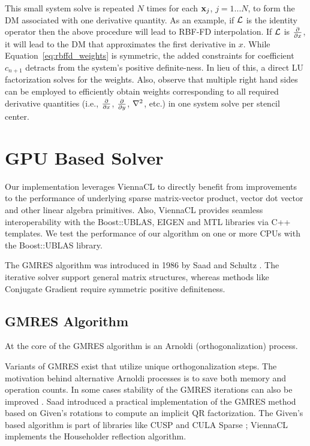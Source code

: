 This small system solve is repeated $N$ times for each $\mathbf{x}_j$, $j=1...N$, to form the DM associated with one derivative quantity.
As an example, if $\diffop$ is the identity operator then the above procedure will lead to RBF-FD interpolation. If $\diffop$ is $\frac{\partial }{\partial x}$, it will lead to the DM that approximates the first derivative in $x$. %
While Equation~\ref{eq:rbffd_weights} is symmetric, the added constraints for coefficient $c_{n+1}$ detracts from the system's positive definite-ness. In lieu of this, a direct LU factorization solves for the weights. 
Also, observe that multiple right hand sides can be employed to efficiently obtain weights corresponding to all required derivative quantities (i.e., $\frac{\partial }{\partial x}$, $\frac{\partial }{\partial y}$, $\Laplacian$, etc.) in one system solve per stencil center.


\section{GPU Based Solver}

Our implementation leverages ViennaCL to directly benefit from improvements to the performance of underlying sparse matrix-vector product, vector dot vector and other linear algebra primitives. Also, ViennaCL provides seamless interoperability with the Boost::UBLAS, EIGEN and MTL libraries via C++ templates. We test the performance of our algorithm on one or more CPUs with the Boost::UBLAS library. 


The GMRES algorithm was introduced in 1986 by Saad and Schultz \cite{Saad1986}. The iterative solver support general matrix structures, whereas methods like Conjugate Gradient require symmetric positive definiteness. 

\subsection{GMRES Algorithm} 

At the core of the GMRES algorithm is an Arnoldi (orthogonalization) process. %

Variants of GMRES exist that utilize unique orthogonalization steps. The motivation behind alternative Arnoldi processes is to save both memory and operation counts. In some cases stability of the GMRES iterations can also be improved \cite{FindRef}. Saad \cite{Saad1986} introduced a practical implementation of the GMRES method based on Given's rotations to compute an implicit QR factorization. The Given's based algorithm is part of libraries like CUSP \cite{Cusp2010} and CULA Sparse \cite{CULASparse}; ViennaCL implements the Householder reflection algorithm. 

